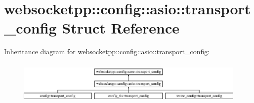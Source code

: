 \hypertarget{structwebsocketpp_1_1config_1_1asio_1_1transport__config}{}\section{websocketpp\+:\+:config\+:\+:asio\+:\+:transport\+\_\+config Struct Reference}
\label{structwebsocketpp_1_1config_1_1asio_1_1transport__config}
Inheritance diagram for websocketpp\+:\+:config\+:\+:asio\+:\+:transport\+\_\+config\+:\begin{figure}[H]
\begin{center}
\leavevmode
\includegraphics[height=2.121212cm]{structwebsocketpp_1_1config_1_1asio_1_1transport__config}
\end{center}
\end{figure}
